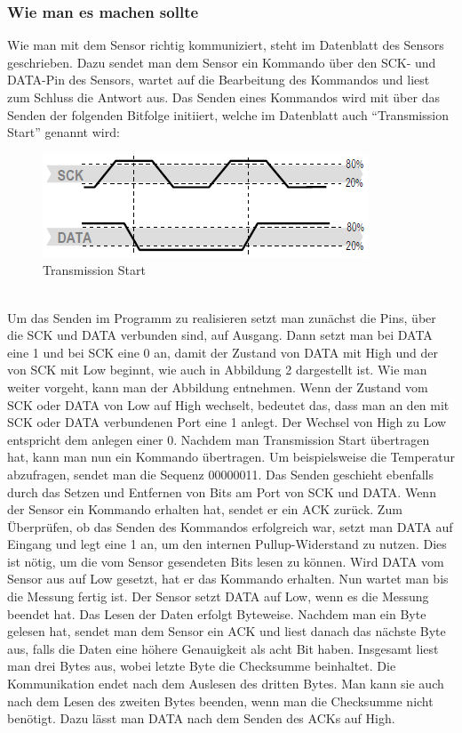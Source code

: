 \documentclass[]{article}
\begin{document}
\subsubsection{Wie man es machen sollte}
Wie man mit dem Sensor richtig kommuniziert, steht im Datenblatt des Sensors geschrieben. Dazu sendet man dem Sensor ein Kommando über den SCK- und DATA-Pin des Sensors, wartet auf die Bearbeitung des Kommandos und liest zum Schluss die Antwort aus. 
Das Senden eines Kommandos wird mit über das Senden der folgenden Bitfolge initiiert, welche im Datenblatt auch "`Transmission Start"' genannt wird: 
\begin{figure}[h]
	\centering
	\includegraphics[width=0.5\columnwidth]{transmission_start.png}
	\caption{Transmission Start}
\end{figure}
\\ Um das Senden im Programm zu realisieren setzt man zunächst die Pins, über die SCK und DATA verbunden sind, auf Ausgang. Dann setzt man bei DATA eine 1 und bei SCK eine 0 an, damit der Zustand von DATA mit High und der von SCK mit Low beginnt, wie auch in Abbildung 2 dargestellt ist. Wie man weiter vorgeht, kann man der Abbildung entnehmen. Wenn der Zustand vom SCK oder DATA von Low auf High wechselt, bedeutet das, dass man an den mit SCK oder DATA verbundenen Port eine 1 anlegt. Der Wechsel von High zu Low entspricht dem anlegen einer 0. Nachdem man Transmission Start übertragen hat, kann man nun ein Kommando übertragen. Um beispielsweise die Temperatur abzufragen, sendet man die Sequenz 00000011. Das Senden geschieht ebenfalls durch das Setzen und Entfernen von Bits am Port von SCK und DATA. Wenn der Sensor ein Kommando erhalten hat, sendet er ein ACK zurück. Zum Überprüfen, ob das Senden des Kommandos erfolgreich war, setzt man DATA auf Eingang und legt eine 1 an, um den internen Pullup-Widerstand zu nutzen. Dies ist nötig, um die vom Sensor gesendeten Bits lesen zu können. Wird DATA vom Sensor aus auf Low gesetzt, hat er das Kommando erhalten. Nun wartet man bis die Messung fertig ist. Der Sensor setzt DATA auf Low, wenn es die Messung beendet hat. Das Lesen der Daten erfolgt Byteweise. Nachdem man ein Byte gelesen hat, sendet man dem Sensor ein ACK und liest danach das nächste Byte aus, falls die Daten eine höhere Genauigkeit als acht Bit haben. Insgesamt liest man drei Bytes aus, wobei letzte Byte die Checksumme beinhaltet. Die Kommunikation endet nach dem Auslesen des dritten Bytes. Man kann sie auch nach dem Lesen des zweiten Bytes beenden, wenn man die Checksumme nicht benötigt. Dazu lässt man DATA nach dem Senden des ACKs auf High. 
\end{document}

